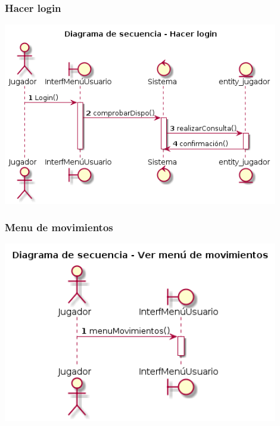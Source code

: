 \subsubsection{Hacer login}
\begin{center}
  \includegraphics[width=0.9\textwidth]{./imatges/jugador/Hacer_login.png}
  \end{center}

\subsubsection{Menu de movimientos}
\begin{center}
  \includegraphics[width=0.9\textwidth]{./imatges/jugador/Menu_de_movimientos.png}
  \end{center}

